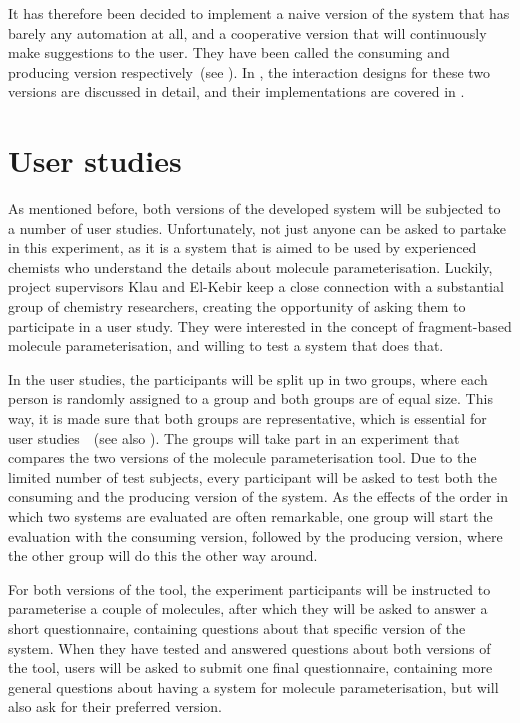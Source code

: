 It has therefore been decided to implement a naive version of the system that has barely any automation at all, and a cooperative version that will continuously make suggestions to the user. They have been called the consuming and producing version respectively~(see ). In , the interaction designs for these two versions are discussed in detail, and their implementations are covered in .



\section{User studies}
As mentioned before, both versions of the developed system will be subjected to a number of user studies. Unfortunately, not just anyone can be asked to partake in this experiment, as it is a system that is aimed to be used by experienced chemists who understand the details about molecule parameterisation. Luckily, project supervisors Klau and El-Kebir keep a close connection with a substantial group of chemistry researchers, creating the opportunity of asking them to participate in a user study. They were interested in the concept of fragment-based molecule parameterisation, and willing to test a system that does that.

In the user studies, the participants will be split up in two groups, where each person is randomly assigned to a group and both groups are of equal size. This way, it is made sure that both groups are representative, which is essential for user studies~\cite{wohlin2003empirical}~(see also ). The groups will take part in an experiment that compares the two versions of the molecule parameterisation tool. Due to the limited number of test subjects, every participant will be asked to test both the consuming and the producing version of the system. As the effects of the order in which two systems are evaluated are often remarkable, one group will start the evaluation with the consuming version, followed by the producing version, where the other group will do this the other way around.

For both versions of the tool, the experiment participants will be instructed to parameterise a couple of molecules, after which they will be asked to answer a short questionnaire, containing questions about that specific version of the system. When they have tested and answered questions about both versions of the tool, users will be asked to submit one final questionnaire, containing more general questions about having a system for molecule parameterisation, but will also ask for their preferred version.

